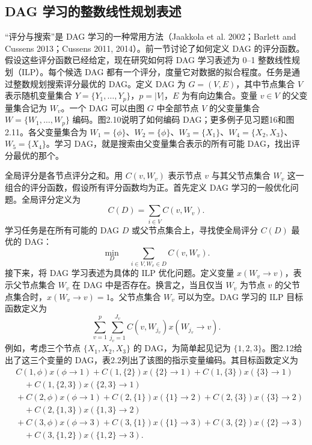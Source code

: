 \subsection{DAG 学习的整数线性规划表述}

“评分与搜索”是 DAG 学习的一种常用方法（Jaakkola et al. 2002；Barlett and Cussens 2013；Cussens 2011, 2014）。前一节讨论了如何定义 DAG 的评分函数。假设这些评分函数已经给定，现在研究如何将 DAG 学习表述为 0--1 整数线性规划（ILP）。每个候选 DAG 都有一个评分，度量它对数据的拟合程度。任务是通过整数规划搜索评分最优的 DAG。定义 DAG 为 $G=(V,E)$，其中节点集合 $V$ 表示随机变量集合 $Y=\{Y_1,\ldots,Y_p\}$，$p=|V|$，$E$ 为有向边集合。变量 $v\in V$ 的父变量集合记为 $W_v$。一个 DAG 可以由图 $G$ 中全部节点 $V$ 的父变量集合 $W=\{W_1,\ldots,W_p\}$ 编码。图2.10说明了如何编码 DAG；更多例子见习题16和图2.11。各父变量集合为 $W_1=\{\phi\}$、$W_2=\{\phi\}$、$W_3=\{X_1\}$、$W_4=\{X_2,X_3\}$、$W_5=\{X_4\}$。学习 DAG，就是搜索由父变量集合表示的所有可能 DAG，找出评分最优的那个。
\begin{figure}[htbp]
\centering
{}
\end{figure}
\begin{figure}[htbp]
\centering
{}
\end{figure}
全局评分是各节点评分之和。用 $C(v,W_v)$ 表示节点 $v$ 与其父节点集合 $W_v$ 这一组合的评分函数，假设所有评分函数均为正。首先定义 DAG 学习的一般优化问题。全局评分定义为
\[
C(D)=\sum_{i\in V}C(v,W_v).
\]
学习任务是在所有可能的 DAG $D$ 或父节点集合上，寻找使全局评分 $C(D)$ 最优的 DAG：
\[
\min_D\quad\sum_{i\in V,W_v\in D}C(v,W_v).
\]
接下来，将 DAG 学习表述为具体的 ILP 优化问题。定义变量 $x(W_v\to v)$，表示父节点集合 $W_v$ 在 DAG 中是否存在。换言之，当且仅当 $W_v$ 为节点 $v$ 的父节点集合时，$x(W_v\to v)=1$。父节点集合 $W_v$ 可以为空。DAG 学习的 ILP 目标函数定义为
\begin{equation}
\sum_{v=1}^{p}\sum_{j_v=1}^{J_v}
C(v,W_{j_v})x(W_{j_v}\to v).
\tag{2.152}
\end{equation}
例如，考虑三个节点 $\{X_1,X_2,X_3\}$ 的 DAG，为简单起见记为 $\{1,2,3\}$。图2.12给出了这三个变量的 DAG，表2.2列出了该图的指示变量编码。其目标函数定义为
\[
\begin{aligned}
&C(1,\phi)x(\phi\to1)+C(1,\{2\})x(\{2\}\to1)
+C(1,\{3\})x(\{3\}\to1)\\
&\quad+C(1,\{2,3\})x(\{2,3\}\to1)\\
&{}+C(2,\phi)x(\phi\to1)+C(2,\{1\})x(\{1\}\to2)
+C(2,\{3\})x(\{3\}\to2)\\
&\quad+C(2,\{1,3\})x(\{1,3\}\to2)\\
&{}+C(3,\phi)x(\phi\to3)+C(3,\{1\})x(\{1\}\to3)
+C(3,\{2\})x(\{2\}\to3)\\
&\quad+C(3,\{1,2\})x(\{1,2\}\to3).
\end{aligned}
\]
